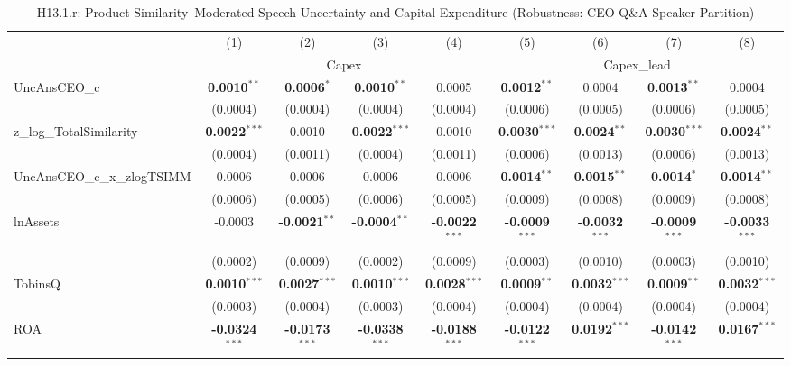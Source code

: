 \begin{landscape}
\begin{table}[H]
\setlength{\tabcolsep}{3pt}
\renewcommand{\arraystretch}{0.85}
\centering
\caption{H13.1.r: Product Similarity--Moderated Speech Uncertainty and Capital Expenditure (Robustness: CEO Q\&A Speaker Partition)}
\label{tab:h13_1_robust}
\scriptsize
\begin{tabular}{lcccccccc}
\toprule
 & (1) & (2) & (3) & (4) & (5) & (6) & (7) & (8) \\
 & \multicolumn{4}{c}{Capex} & \multicolumn{4}{c}{Capex\_lead} \\
\cmidrule(lr){2-5} \cmidrule(lr){6-9}
\midrule
UncAnsCEO\_c & \textbf{0.0010}$^{**}$ & \textbf{0.0006}$^{*}$ & \textbf{0.0010}$^{**}$ & 0.0005 & \textbf{0.0012}$^{**}$ & 0.0004 & \textbf{0.0013}$^{**}$ & 0.0004 \\
 & (0.0004) & (0.0004) & (0.0004) & (0.0004) & (0.0006) & (0.0005) & (0.0006) & (0.0005) \\
z\_log\_TotalSimilarity & \textbf{0.0022}$^{***}$ & 0.0010 & \textbf{0.0022}$^{***}$ & 0.0010 & \textbf{0.0030}$^{***}$ & \textbf{0.0024}$^{**}$ & \textbf{0.0030}$^{***}$ & \textbf{0.0024}$^{**}$ \\
 & (0.0004) & (0.0011) & (0.0004) & (0.0011) & (0.0006) & (0.0013) & (0.0006) & (0.0013) \\
UncAnsCEO\_c\_x\_zlogTSIMM & 0.0006 & 0.0006 & 0.0006 & 0.0006 & \textbf{0.0014}$^{**}$ & \textbf{0.0015}$^{**}$ & \textbf{0.0014}$^{*}$ & \textbf{0.0014}$^{**}$ \\
 & (0.0006) & (0.0005) & (0.0006) & (0.0005) & (0.0009) & (0.0008) & (0.0009) & (0.0008) \\
\midrule
lnAssets & -0.0003 & \textbf{-0.0021}$^{**}$ & \textbf{-0.0004}$^{**}$ & \textbf{-0.0022}$^{***}$ & \textbf{-0.0009}$^{***}$ & \textbf{-0.0032}$^{***}$ & \textbf{-0.0009}$^{***}$ & \textbf{-0.0033}$^{***}$ \\
 & (0.0002) & (0.0009) & (0.0002) & (0.0009) & (0.0003) & (0.0010) & (0.0003) & (0.0010) \\
TobinsQ & \textbf{0.0010}$^{***}$ & \textbf{0.0027}$^{***}$ & \textbf{0.0010}$^{***}$ & \textbf{0.0028}$^{***}$ & \textbf{0.0009}$^{**}$ & \textbf{0.0032}$^{***}$ & \textbf{0.0009}$^{**}$ & \textbf{0.0032}$^{***}$ \\
 & (0.0003) & (0.0004) & (0.0003) & (0.0004) & (0.0004) & (0.0004) & (0.0004) & (0.0004) \\
ROA & \textbf{-0.0324}$^{***}$ & \textbf{-0.0173}$^{***}$ & \textbf{-0.0338}$^{***}$ & \textbf{-0.0188}$^{***}$ & \textbf{-0.0122}$^{***}$ & \textbf{0.0192}$^{***}$ & \textbf{-0.0142}$^{***}$ & \textbf{0.0167}$^{***}$ \\

\end{tabular}
\end{table}
\end{landscape}
